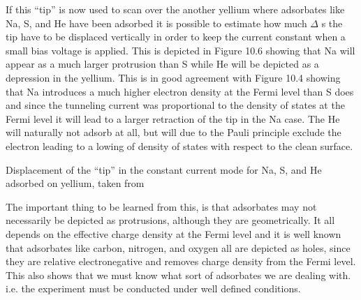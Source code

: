 If this ``tip'' is now used to scan over the another yellium where adsorbates like Na, S, and He have been adsorbed it is possible to estimate how much $\Delta$ s the tip have to be displaced vertically in order to keep the current constant when a small bias voltage is applied. This is depicted in Figure 10.6 showing that Na will appear as a much larger protrusion than S while He will be depicted as a depression in the yellium. This is in good agreement with Figure 10.4 showing that Na introduces a much higher electron density at the Fermi level than  S does and since the tunneling current was proportional to the density of states at the Fermi level it will lead to a larger retraction of the tip in the Na case. The He will naturally not adsorb at all, but will due to the Pauli principle exclude the electron leading to a lowing of density of states with respect to the clean surface. 

\vspace*{8cm}

 Displacement of the ``tip'' in the  constant current mode for Na, S, and He adsorbed on yellium, taken from \cite{Lang}

\vspace{1cm}  


The important thing to be learned from this, is that adsorbates may not necessarily be depicted as protrusions, although they are geometrically. It all depends on the effective charge density at the Fermi level and it is well known that adsorbates like carbon, nitrogen, and  oxygen all are depicted as holes, since they are relative electronegative and removes charge density from the Fermi level. This also shows that we must know what sort of adsorbates we are dealing with. i.e. the experiment must be conducted under well defined conditions.

